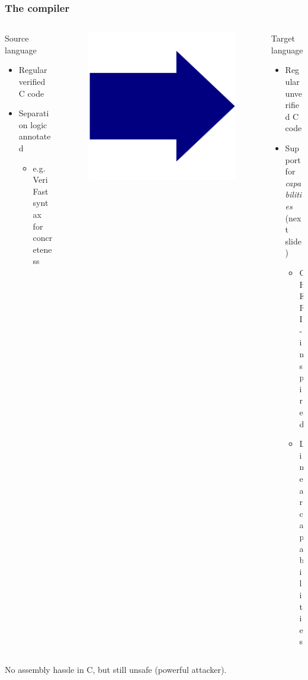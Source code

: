 \documentclass{beamer}
\begin{document}
\begin{frame}
\frametitle{The compiler}
\begin{columns}
\begin{column}{0.45\textwidth}
	\begin{block}{Source language}
	\begin{itemize}
	\item Regular verified C code
	\item Separation logic annotated
		\begin{itemize}
		\item e.g. VeriFast syntax for concreteness
		\end{itemize}
	\end{itemize}
	\end{block}
\end{column}
\begin{column}{0.08\textwidth}
	\begin{figure}
	\includegraphics[width=0.8\linewidth]{BlueArrow}
	\end{figure}
\end{column}
\begin{column}{0.45\textwidth}
    \begin{block}{Target language}
	\begin{itemize}
	\item Regular unverified C code
	\item Support for \emph{capabilities} \\(next slide)
		\begin{itemize}
		\item CHERI-inspired 
		\item Linear capabilities
		\end{itemize}
	\end{itemize}
	\end{block}
\end{column}
\end{columns}
\center No assembly hassle in C, but still unsafe (powerful attacker).


\end{frame}
\end{document}
